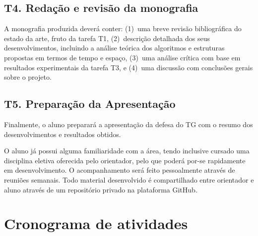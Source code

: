 \documentclass[12pt, a4paper, oneside]{article}
\begin{document}
\subsection{T4. Redação e revisão da monografia}

A monografia produzida deverá conter:
(1)~uma breve revisão bibliográfica do estado da arte, fruto da tarefa T1, (2)~descrição detalhada dos seus desenvolvimentos, incluindo a análise teórica dos algoritmos e estruturas propostas em termos de tempo e espaço, (3)~uma análise crítica com base em resultados experimentais da tarefa T3, e (4)~uma discussão com conclusões gerais sobre o projeto.


\subsection{T5. Preparação da Apresentação}

Finalmente, o aluno preparará a apresentação da defesa do TG com o resumo dos desenvolvimentos e resultados obtidos.

\medskip

O aluno já possui alguma familiaridade com a área, tendo inclusive cursado uma disciplina eletiva oferecida pelo orientador, pelo que poderá por-se rapidamente em desenvolvimento. O acompanhamento será feito pessoalmente através de reuniões semanais. Todo material desenvolvido é compartilhado entre orientador e aluno através de um repositório privado na plataforma GitHub. 


\clearpage
\section{Cronograma de atividades}
\end{document}
